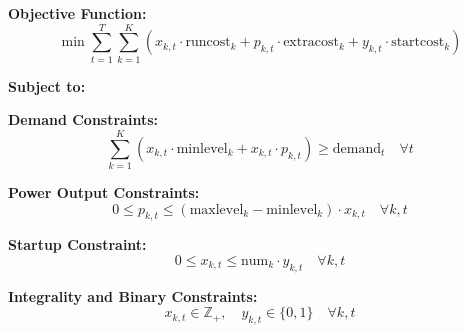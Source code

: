 \documentclass{article}
\begin{document}
\textbf{Objective Function:}
\[
\min \sum_{t=1}^{T} \sum_{k=1}^{K} \left( x_{k,t} \cdot \text{runcost}_k + p_{k,t} \cdot \text{extracost}_k + y_{k,t} \cdot \text{startcost}_k \right)
\]

\textbf{Subject to:}

\textbf{Demand Constraints:}
\[
\sum_{k=1}^{K} \left( x_{k,t} \cdot \text{minlevel}_k + x_{k,t} \cdot p_{k,t} \right) \geq \text{demand}_t \quad \forall t
\]

\textbf{Power Output Constraints:}
\[
0 \leq p_{k,t} \leq (\text{maxlevel}_k - \text{minlevel}_k) \cdot x_{k,t} \quad \forall k, t
\]

\textbf{Startup Constraint:}
\[
0 \leq x_{k,t} \leq \text{num}_k \cdot y_{k,t} \quad \forall k, t
\]

\textbf{Integrality and Binary Constraints:}
\[
x_{k,t} \in \mathbb{Z}_{+}, \quad y_{k,t} \in \{0, 1\} \quad \forall k, t
\]
\end{document}
